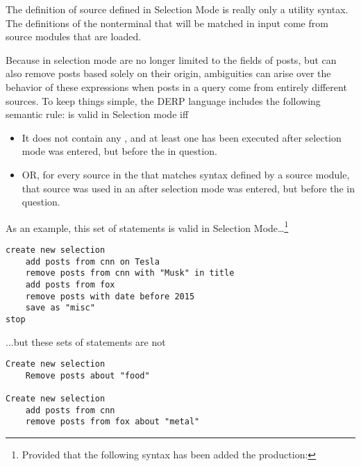 The definition of source defined in Selection Mode is really only a utility syntax. The definitions of the nonterminal that will be matched in input come
from source modules that are loaded.

Because  in selection mode are no longer limited to the fields of posts, but can also remove posts based solely on their origin, ambiguities
can arise over the behavior of these expressions when posts in a query come from entirely different sources. To keep things simple, the DERP language includes
the following semantic rule:  is valid in Selection mode iff
\begin{itemize}
\item It does not contain any , and at least one  has been executed after selection mode was entered, but before the  in question.
\item OR, for every source in the  that matches syntax defined by a source module, that source was used in an  after selection mode was entered, but before the  in question.
\end{itemize}
As an example, this set of statements is valid in Selection Mode…\footnote{Provided that the following syntax has been added the production: \hspace{.25in}  \bnf{:}  \bnf{|} }
\newline\begin{minipage}{\linewidth}\begin{lstlisting}
create new selection
    add posts from cnn on Tesla
    remove posts from cnn with "Musk" in title
    add posts from fox
    remove posts with date before 2015
    save as "misc"
stop
\end{lstlisting}\end{minipage}
...but these sets of statements are not
\newline\begin{minipage}{\linewidth}\begin{lstlisting}
Create new selection
    Remove posts about "food"

Create new selection
    add posts from cnn
    remove posts from fox about "metal"
\end{lstlisting}\end{minipage}
